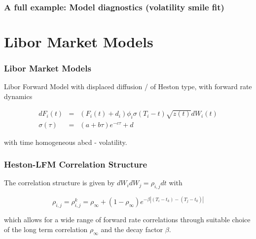 \documentclass{beamer}
\begin{document}
\begin{frame}[fragile]
\frametitle{A full example: Model diagnostics (volatility smile fit)}
\end{frame}

\section{Libor Market Models}

\begin{frame}
\frametitle{Libor Market Models}
Libor Forward Model with displaced diffusion / of Heston type, with forward rate dynamics

\begin{eqnarray}
dF_i(t) &=&  (F_i(t) + d_i) \phi_i \sigma(T_i - t) \sqrt{z(t)} dW_i(t) \\
\sigma(\tau) &=& (a + b\tau) e^{-c\tau} + d
\end{eqnarray} 

with time homogeneous abcd - volatility.
\end{frame}


\begin{frame}
\frametitle{Heston-LFM Correlation Structure}
The correlation structure is given by $dW_i dW_j = \rho_{i,j} dt$ with

\begin{equation}
\rho_{i,j} = \rho_{i,j}^k = \rho_\infty + (1-\rho_\infty) e^{-\beta |(T_i-t_k)-(T_j-t_k)|}
\end{equation}

which allows for a wide range of forward rate correlations through suitable choice of the long term correlation $\rho_\infty$ and the decay factor $\beta$.
\end{frame}
\end{document}
